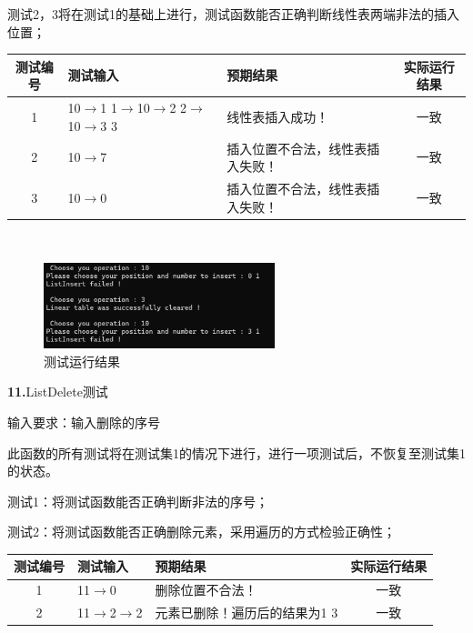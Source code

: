 \documentclass[supercite]{Experimental_Report}
\theoremstyle{definition}
\begin{document}
	测试2，3将在测试1的基础上进行，测试函数能否正确判断线性表两端非法的插入位置；

\vspace{0.5em}

\begin{tabular}{|c|p{2.8cm}|p{5cm}|c|}
	\hline
	测试编号 & 测试输入 & 预期结果 & 实际运行结果 \\
	\hline
	1 & 10$\rightarrow$1 1$\rightarrow$10$\rightarrow$2 2$\rightarrow$10$\rightarrow$3 3 & 线性表插入成功！ & 一致 \\
	\hline
	2 & 10$\rightarrow$7 & 插入位置不合法，线性表插入失败！ & 一致 \\
	\hline
	3 & 10$\rightarrow$0 & 插入位置不合法，线性表插入失败！ & 一致 \\
	\hline
\end{tabular}

~\

 \begin{figure}[H]
 	\centering
 	\includegraphics[width=0.6\textwidth]{images/线性表测试10.png}
 	\caption{测试运行结果}
 	\label{txlab}
 \end{figure}


\noindent\textbf{11.}ListDelete测试

	输入要求：输入删除的序号

	此函数的所有测试将在测试集1的情况下进行，进行一项测试后，不恢复至测试集1的状态。

	测试1：将测试函数能否正确判断非法的序号；

	测试2：将测试函数能否正确删除元素，采用遍历的方式检验正确性；


\vspace{0.5em}

\begin{tabular}{|c|p{2.7cm}|p{4.5cm}|c|}
	\hline
	测试编号 & 测试输入 & 预期结果 & 实际运行结果 \\
	\hline
	1 & 11$\rightarrow$0 & 删除位置不合法！ & 一致 \\
	\hline
	2 & 11$\rightarrow$2$\rightarrow$2 & 元素已删除！遍历后的结果为1 3 & 一致 \\
	\hline
\end{tabular}

~\
\end{document}

